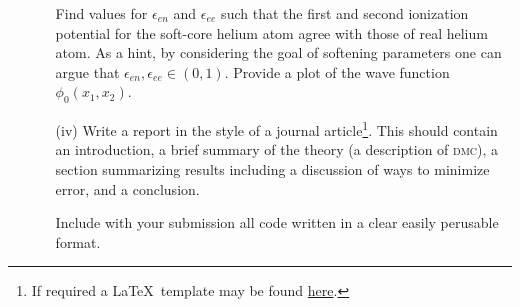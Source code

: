 \documentclass[letterpaper, 11 pt]{article}
\begin{document}
\begin{itemize}
\begin{itemize}
            Find values for $\epsilon_{en}$ and $\epsilon_{ee}$ such that the first and second
            ionization potential for the soft-core helium atom agree with those of real helium atom.
            As a hint, by considering the goal of softening parameters one can argue that
            $\epsilon_{en}, \epsilon_{ee} \in (0,1)$. Provide a plot of the wave function
            $\phi_0(x_1, x_2)$.

         \item[(iv)] Write a report in the style of a journal article\footnote{If required a \LaTeX\
            template may be found \href{https://journals.aps.org/revtex}{here}.}. This should contain an
            introduction, a brief summary of the theory (a  description of \textsc{dmc}), a section
            summarizing results including a discussion of ways to minimize error, and a conclusion.

            Include with your submission all code written in a clear easily perusable format.

      \end{itemize}

\end{itemize}

\printbibliography[title=References]
\end{document}
